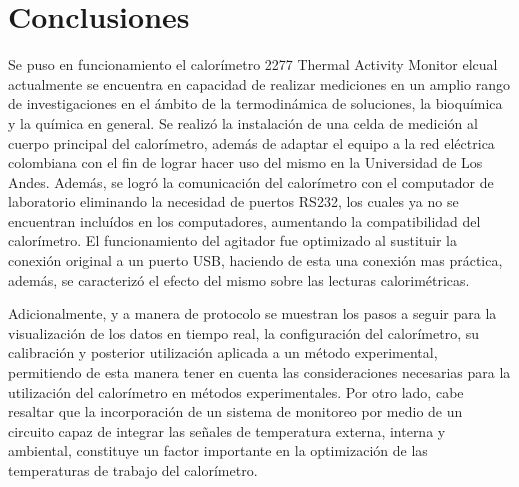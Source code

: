 
%




\chapter{Conclusiones}
Se puso en funcionamiento el calorímetro 2277 Thermal Activity Monitor elcual actualmente se encuentra en capacidad de realizar mediciones en un amplio rango de investigaciones en el ámbito de la termodinámica de soluciones, la bioqu\'imica y la qu\'imica en general. Se realiz\'o la instalaci\'on de una celda de medici\'on al cuerpo principal del calor\'imetro, adem\'as de adaptar el equipo a la red eléctrica colombiana con el fin de lograr hacer uso del mismo en la Universidad de Los Andes. Además, se logró la comunicaci\'on del calor\'imetro con el computador de laboratorio eliminando la necesidad de puertos RS232, los cuales ya no se encuentran incluídos en los computadores, aumentando la compatibilidad del calorímetro. El funcionamiento del agitador fue optimizado al sustituir la conexión original a un puerto USB, haciendo de esta una conexión mas práctica, adem\'as, se caracteriz\'o el efecto del mismo sobre las lecturas calorim\'etricas. 

Adicionalmente, y a manera de protocolo se muestran los pasos a seguir para la visualización de los datos en tiempo real, la configuración del calor\'imetro, su calibración y posterior utilización aplicada a un método experimental, permitiendo de esta manera tener en cuenta las consideraciones necesarias para la utilización del calorímetro en métodos experimentales. Por otro lado, cabe resaltar que la incorporación de un sistema de monitoreo por medio de un circuito capaz de integrar las señales de temperatura externa, interna y ambiental, constituye un factor importante en la optimización de las temperaturas de trabajo del calor\'imetro. 

